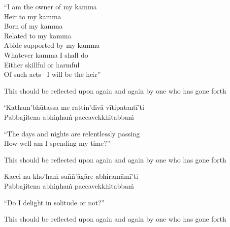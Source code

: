 \begin{english-verses}
  ``I am the owner of my kamma\\
  Heir to my kamma\\
  Born of my kamma\\
  Related to my kamma\\
  Abide supported by my kamma\\
  Whatever kamma I shall do\\
  Either skillful or harmful\\
  Of such acts \breathmark\ I will be the heir''\ifdigitalversion\makeatletter\hyperlink{endnote102-appendix}\makeatother\fi
  \begin{english-hang-together-verses}
    This should be reflected upon again and again by one who has gone forth
  \end{english-hang-together-verses}
\end{english-verses}

`Katham'bhūtassa me rattin'divā vītipatantī'ti\\
Pabbajitena abhiṇhaṁ paccavekkhitabbaṁ

\begin{english-verses}
  ``The days and nights are relentlessly passing\\
  How well am I spending my time?''
  \ifninebythirteenversion\clearpage\fi
  \begin{english-hang-together-verses}
    This should be reflected upon again and again by one who has gone forth
  \end{english-hang-together-verses}
\end{english-verses}

Kacci nu kho'haṁ suññ'āgāre abhiramāmī'ti\\
Pabbajitena abhiṇhaṁ paccavekkhitabbaṁ

\begin{english-verses}
  ``Do I delight in solitude or not?''
  \begin{english-hang-together-verses}
    This should be reflected upon again and again by one who has gone forth
  \end{english-hang-together-verses}
\end{english-verses}

